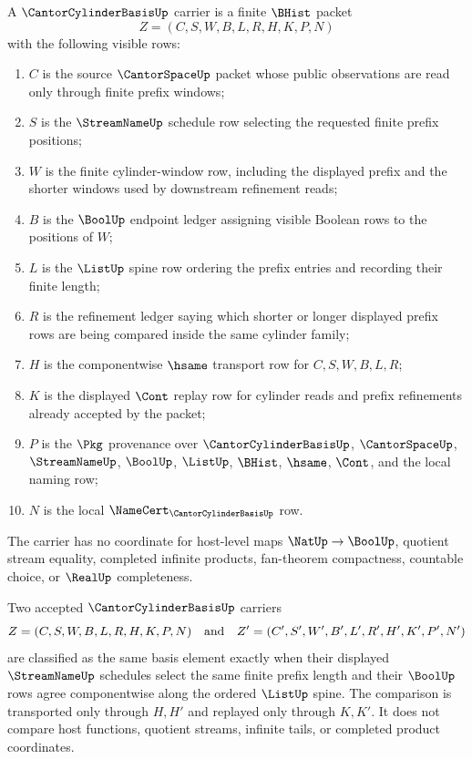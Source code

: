 \begin{definition}
\label{def:cantor-cylinder-basis-carrier}
A $\CantorCylinderBasisUp$ carrier is a finite $\BHist$ packet
$$
Z=(C,S,W,B,L,R,H,K,P,N)
$$
with the following visible rows:
\begin{enumerate}
\item $C$ is the source $\CantorSpaceUp$ packet whose public observations are
read only through finite prefix windows;
\item $S$ is the $\StreamNameUp$ schedule row selecting the requested finite
prefix positions;
\item $W$ is the finite cylinder-window row, including the displayed prefix
and the shorter windows used by downstream refinement reads;
\item $B$ is the $\BoolUp$ endpoint ledger assigning visible Boolean rows to
the positions of $W$;
\item $L$ is the $\ListUp$ spine row ordering the prefix entries and recording
their finite length;
\item $R$ is the refinement ledger saying which shorter or longer displayed
prefix rows are being compared inside the same cylinder family;
\item $H$ is the componentwise $\hsame$ transport row for $C,S,W,B,L,R$;
\item $K$ is the displayed $\Cont$ replay row for cylinder reads and prefix
refinements already accepted by the packet;
\item $P$ is the $\Pkg$ provenance over $\CantorCylinderBasisUp$,
$\CantorSpaceUp$, $\StreamNameUp$, $\BoolUp$, $\ListUp$, $\BHist$, $\hsame$,
$\Cont$, and the local naming row;
\item $N$ is the local $\NameCert_{\CantorCylinderBasisUp}$ row.
\end{enumerate}
The carrier has no coordinate for host-level maps $\NatUp \to \BoolUp$,
quotient stream equality, completed infinite products, fan-theorem
compactness, countable choice, or $\RealUp$ completeness.
\end{definition}

\begin{definition}
\label{def:cantor-cylinder-basis-classifier}
Two accepted $\CantorCylinderBasisUp$ carriers
$$
Z=(C,S,W,B,L,R,H,K,P,N)
\quad\hbox{and}\quad
Z'=(C',S',W',B',L',R',H',K',P',N')
$$
are classified as the same basis element exactly when their displayed
$\StreamNameUp$ schedules select the same finite prefix length and their
$\BoolUp$ rows agree componentwise along the ordered $\ListUp$ spine. The
comparison is transported only through $H,H'$ and replayed only through
$K,K'$. It does not compare host functions, quotient streams, infinite tails,
or completed product coordinates.
\end{definition}


